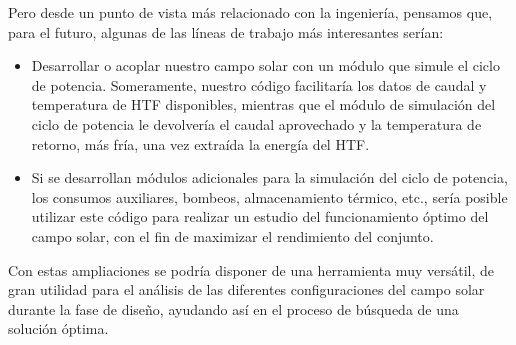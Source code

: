 Pero desde un punto de vista más relacionado con la ingeniería, pensamos que, para el futuro, algunas de las líneas de trabajo más interesantes serían:

\begin{itemize}
\item
Desarrollar o acoplar nuestro campo solar con un módulo que simule el ciclo de potencia. Someramente, nuestro código facilitaría los datos de caudal y temperatura de HTF disponibles, mientras que el módulo de simulación del ciclo de potencia le devolvería el caudal aprovechado y la temperatura de retorno, más fría, una vez extraída la energía del HTF.
\item
Si se desarrollan módulos adicionales para la simulación del ciclo de potencia, los consumos auxiliares, bombeos, almacenamiento térmico, etc., sería posible utilizar este código para realizar un estudio del funcionamiento óptimo del campo solar, con el fin de maximizar el rendimiento del conjunto.
\end{itemize}

Con estas ampliaciones se podría disponer de una herramienta muy versátil, de gran utilidad para el análisis de las diferentes configuraciones del campo solar durante la fase de diseño, ayudando así en el proceso de búsqueda de una solución óptima.



